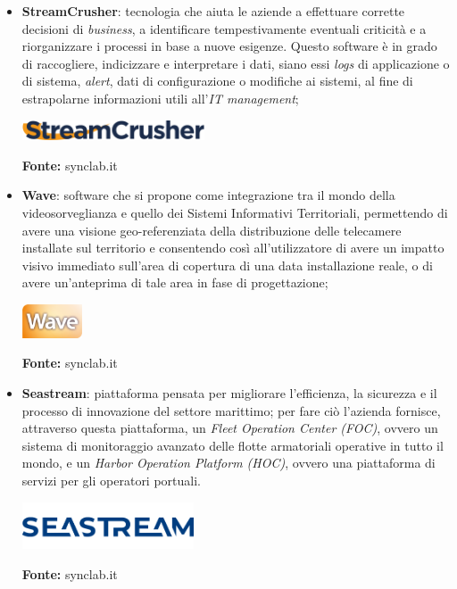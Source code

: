\begin{itemize}
  \item \textbf{StreamCrusher}: tecnologia che aiuta le aziende a effettuare corrette decisioni di \textit{business}, a identificare tempestivamente eventuali criticità e a riorganizzare i processi in base a nuove esigenze. Questo software è in grado di raccogliere, indicizzare e interpretare i dati, siano essi \textit{logs} di applicazione o di sistema, \textit{alert}, dati di configurazione o modifiche ai sistemi, al fine di estrapolarne informazioni utili all'\textit{IT management};

  \begin{minipage}{\linewidth}
    \centering
      \includegraphics[height=0.6cm]{immagini/streamcrusher}
    \caption*{\textbf{Fonte:} synclab.it}
  \end{minipage}

  \item \textbf{Wave}: software che si propone come integrazione tra il mondo della videosorveglianza e quello dei Sistemi Informativi Territoriali, permettendo di avere una visione geo-referenziata della distribuzione delle telecamere installate sul territorio e consentendo così all'utilizzatore di avere un impatto visivo immediato sull'area di copertura di una data installazione reale, o di avere un'anteprima di tale area in fase di progettazione;

  \begin{minipage}{\linewidth}
    \centering
      \includegraphics[height=1cm]{immagini/wave}
    \caption*{\textbf{Fonte:} synclab.it}
  \end{minipage}

  \item \textbf{Seastream}: piattaforma pensata per migliorare l'efficienza, la sicurezza e il processo di innovazione del settore marittimo; per fare ciò l'azienda fornisce, attraverso questa piattaforma, un \textit{Fleet Operation Center (FOC)}, ovvero un sistema di monitoraggio avanzato delle flotte armatoriali operative in tutto il mondo, e un \textit{Harbor Operation Platform (HOC)}, ovvero una piattaforma di servizi per gli operatori portuali.

  \begin{minipage}{\linewidth}
    \centering
      \includegraphics[height=1.4cm]{immagini/seastream}
    \caption*{\textbf{Fonte:} synclab.it}
  \end{minipage}
\end{itemize}

